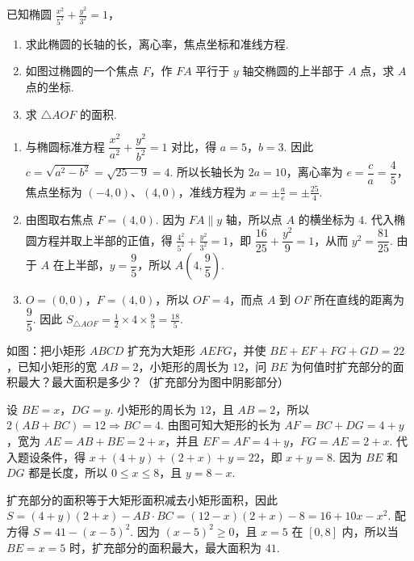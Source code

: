 \begin{problem}
已知椭圆 \(\frac{x^{2}}{5^{2}}+\frac{y^{2}}{3^{2}}=1\)，

\begin{enumerate}
  \item 求此椭圆的长轴的长，离心率，焦点坐标和准线方程.
  \item 如图过椭圆的一个焦点 \(F\)，作 \(FA\) 平行于 \(y\) 轴交椭圆的上半部于 \(A\) 点，求 \(A\) 点的坐标.
  \item 求 \(\triangle AOF\) 的面积.
\end{enumerate}

\end{problem}

\begin{solution}
\begin{enumerate}
  \item 与椭圆标准方程 \(\dfrac{x^2}{a^2}+\dfrac{y^2}{b^2}=1\) 对比，得 \(a=5\)，\(b=3\). 因此 \(c=\sqrt{a^2-b^2}=\sqrt{25-9}=4\). 所以长轴长为 \(2a=10\)，离心率为 \(e=\dfrac ca=\dfrac45\)，焦点坐标为 \((-4,0)\)、\((4,0)\)，准线方程为 \(x=\pm\frac ae=\pm\frac{25}{4}\).
  \item 由图取右焦点 \(F=(4,0)\). 因为 \(FA\parallel y\) 轴，所以点 \(A\) 的横坐标为 \(4\). 代入椭圆方程并取上半部的正值，得 \(\frac{4^2}{5^2}+\frac{y^2}{3^2}=1\)，即 \(\dfrac{16}{25}+\dfrac{y^2}{9}=1\)，从而 \(y^2=\dfrac{81}{25}\). 由于 \(A\) 在上半部，\(y=\dfrac95\)，所以 \(A\left(4,\dfrac95\right)\).
  \item \(O=(0,0)\)，\(F=(4,0)\)，所以 \(OF=4\)，而点 \(A\) 到 \(OF\) 所在直线的距离为 \(\dfrac95\). 因此 \(S_{\triangle AOF}=\frac12\times4\times\frac95=\frac{18}{5}\).
\end{enumerate}
\end{solution}

\begin{problem}
如图：把小矩形 \(ABCD\) 扩充为大矩形 \(AEFG\)，并使 \(BE+EF+FG+GD=22\)，已知小矩形的宽 \(AB=2\)，小矩形的周长为 \(12\)，问 \(BE\) 为何值时扩充部分的面积最大？最大面积是多少？（扩充部分为图中阴影部分）

\end{problem}

\begin{solution}
设 \(BE=x\)，\(DG=y\). 小矩形的周长为 \(12\)，且 \(AB=2\)，所以 \(2(AB+BC)=12\Longrightarrow BC=4\).
由图可知大矩形的长为 \(AF=BC+DG=4+y\)，宽为 \(AE=AB+BE=2+x\)，并且 \(EF=AF=4+y\)，\(FG=AE=2+x\). 代入题设条件，得 \(x+(4+y)+(2+x)+y=22\)，即 \(x+y=8\). 因为 \(BE\) 和 \(DG\) 都是长度，所以 \(0\leqslant x\leqslant8\)，且 \(y=8-x\).

扩充部分的面积等于大矩形面积减去小矩形面积，因此 \(S=(4+y)(2+x)-AB\cdot BC=(12-x)(2+x)-8=16+10x-x^2\). 配方得 \(S=41-(x-5)^2\).
因为 \((x-5)^2\geqslant0\)，且 \(x=5\) 在 \([0,8]\) 内，所以当 \(BE=x=5\) 时，扩充部分的面积最大，最大面积为 \(41\).
\end{solution}


